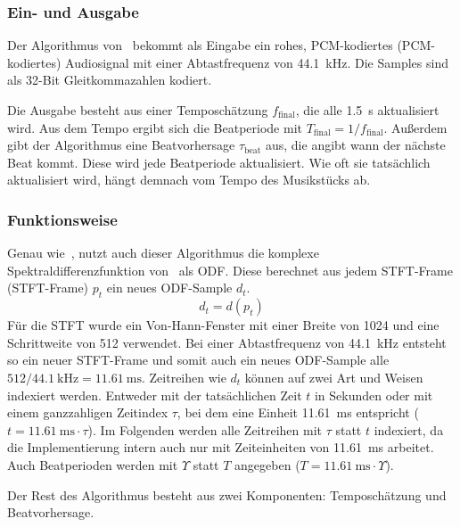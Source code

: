 {{		\subsubsection*{Ein- und Ausgabe}
		{
			Der Algorithmus von~\cite{2009_DaPlSt} bekommt als Eingabe ein rohes, \acs{PCM}-kodiertes (\acl{PCM}-kodiertes) Audiosignal mit einer Abtastfrequenz von \SI{44.1}{\kilo\hertz}.
			Die Samples sind als 32-Bit Gleitkommazahlen kodiert.

			Die Ausgabe besteht aus einer Temposchätzung $f_\text{final}$,
				die alle \SI{1.5}{\second} aktualisiert wird.
			Aus dem Tempo ergibt sich die Beatperiode mit $T_\text{final} = 1 / f_\text{final}$.
			Au{\ss}erdem gibt der Algorithmus eine Beatvorhersage $\tau_\text{beat}$ aus,
				die angibt wann der nächste Beat kommt.
			Diese wird jede Beatperiode aktualisiert.
			Wie oft sie tatsächlich aktualisiert wird,
				hängt demnach vom Tempo des Musikstücks ab.
		}

		\subsubsection*{Funktionsweise}
		{
			Genau wie~\cite{2011_PlRoSt},
				nutzt auch dieser Algorithmus die komplexe Spektraldifferenzfunktion von~\cite{2004_BeDaDuSa}
				als \ac{ODF}.
			Diese berechnet aus jedem \acs{STFT}-Frame (\acl{STFT}-Frame) $p_t$ ein neues \ac{ODF}-Sample $d_t$.
			\begin{equation}
				d_t = d(p_t)
			\end{equation}
			Für die \ac{STFT} wurde ein Von-Hann-Fenster mit einer Breite von \num{1024} und eine Schrittweite von \num{512} verwendet.
			Bei einer Abtastfrequenz von \SI{44.1}{\kilo\hertz} entsteht so ein neuer \acs{STFT}-Frame
				und somit auch ein neues \ac{ODF}-Sample
				alle $512 / \SI{44.1}{\kilo\hertz} = \SI{11.61}{\milli\second}$.
			Zeitreihen wie $d_t$ können auf zwei Art und Weisen indexiert werden.
			Entweder mit der tatsächlichen Zeit $t$ in Sekunden
				oder mit einem ganzzahligen Zeitindex $\tau$,
				bei dem eine Einheit \SI{11.61}{\milli\second} entspricht
				($t = \SI{11.61}{\milli\second} \cdot \tau$).
			Im Folgenden werden alle Zeitreihen mit $\tau$ statt $t$ indexiert,
				da die Implementierung intern auch nur mit Zeiteinheiten von \SI{11.61}{\milli\second} arbeitet.
			Auch Beatperioden werden mit $\Upsilon$ statt $T$ angegeben ($T = \SI{11.61}{\milli\second} \cdot \Upsilon$).

			Der Rest des Algorithmus besteht aus zwei Komponenten:
				Temposchätzung und Beatvorhersage.

}}}
